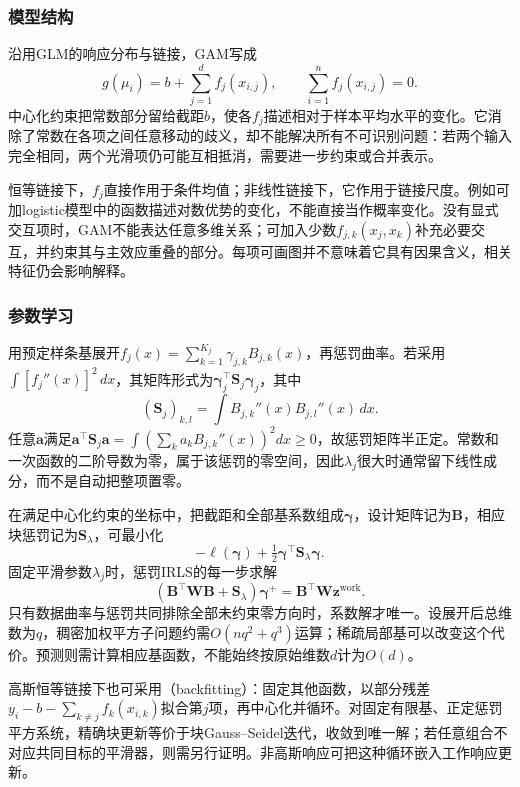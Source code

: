 \subsubsection{模型结构}

沿用GLM的响应分布与链接，GAM写成
\begin{equation}
  g(\mu_i)=b+\sum_{j=1}^{d}f_j(x_{i,j}),
  \qquad \sum_{i=1}^{n}f_j(x_{i,j})=0.
  \label{eq:regression-gam}
\end{equation}
中心化约束把常数部分留给截距$b$，使各$f_j$描述相对于样本平均水平的变化。它消除了常数在各项之间任意移动的歧义，却不能解决所有不可识别问题：若两个输入完全相同，两个光滑项仍可能互相抵消，需要进一步约束或合并表示。

恒等链接下，$f_j$直接作用于条件均值；非线性链接下，它作用于链接尺度。例如可加logistic模型中的函数描述对数优势的变化，不能直接当作概率变化。没有显式交互项时，GAM不能表达任意多维关系；可加入少数$f_{j,k}(x_j,x_k)$补充必要交互，并约束其与主效应重叠的部分。每项可画图并不意味着它具有因果含义，相关特征仍会影响解释。

\subsubsection{参数学习}

用预定样条基展开$f_j(x)=\sum_{k=1}^{K_j}\gamma_{j,k}B_{j,k}(x)$，再惩罚曲率。若采用$\int[f_j''(x)]^2\,dx$，其矩阵形式为$\bm{\gamma}_j^{\top}\bm{S}_j\bm{\gamma}_j$，其中
\[
  (\bm{S}_j)_{k,l}=\int B_{j,k}''(x)B_{j,l}''(x)\,dx.
\]
任意$\bm{a}$满足$\bm{a}^{\top}\bm{S}_j\bm{a}=\int(\sum_k a_kB_{j,k}''(x))^2dx\geq0$，故惩罚矩阵半正定。常数和一次函数的二阶导数为零，属于该惩罚的零空间，因此$\lambda_j$很大时通常留下线性成分，而不是自动把整项置零。

在满足中心化约束的坐标中，把截距和全部基系数组成$\bm{\gamma}$，设计矩阵记为$\bm{B}$，相应块惩罚记为$\bm{S}_{\lambda}$，可最小化
\[
  -\ell(\bm{\gamma})+\tfrac12\bm{\gamma}^{\top}
       \bm{S}_{\lambda}\bm{\gamma}.
\]
固定平滑参数$\lambda_j$时，惩罚IRLS的每一步求解
\begin{equation}
  (\bm{B}^{\top}\bm{W}\bm{B}+\bm{S}_{\lambda})
       \bm{\gamma}^{+}
  =\bm{B}^{\top}\bm{W}\bm{z}^{\mathrm{work}}.
  \label{eq:regression-gam-irls}
\end{equation}
只有数据曲率与惩罚共同排除全部未约束零方向时，系数解才唯一。设展开后总维数为$q$，稠密加权平方子问题约需$O(nq^2+q^3)$运算；稀疏局部基可以改变这个代价。预测则需计算相应基函数，不能始终按原始维数$d$计为$O(d)$。

高斯恒等链接下也可采用（backfitting）：固定其他函数，以部分残差$y_i-b-\sum_{k\ne j}f_k(x_{i,k})$拟合第$j$项，再中心化并循环。对固定有限基、正定惩罚平方系统，精确块更新等价于块Gauss--Seidel迭代，收敛到唯一解；若任意组合不对应共同目标的平滑器，则需另行证明。非高斯响应可把这种循环嵌入工作响应更新。

